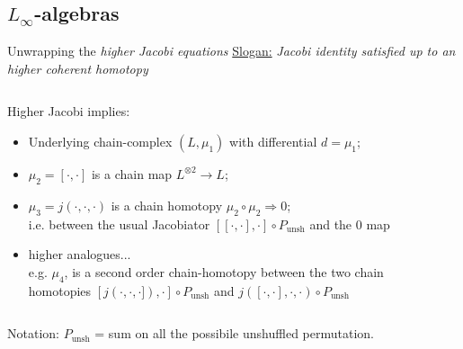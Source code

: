 \documentclass[beamer,10pt]{standalone}
\begin{document}
\subsection{$L_\infty$-algebras}

\begin{frame}{Unwrapping the \emph{higher Jacobi equations}}\label{Frame:unwapping-Jacobi}
\underline{Slogan:} \emph{Jacobi identity satisfied up to an higher coherent homotopy}
		\vspace{1.5em}
		\begin{columns}[c]
			\hfill
			\begin{column}{0.5\linewidth}
				Higher Jacobi implies:
				\begin{itemize}  \setlength\itemsep{1em}
					\item Underlying chain-complex $(L,\mu_1)$ with differential $d=\mu_1$;
					\item \color{red} $\mu_2 = [\cdot,\cdot]$ is a chain map $L^{\otimes 2} \to L$;
					\item \color{green!20!black}$\mu_3=j(\cdot,\cdot,\cdot)$ is a chain homotopy 
						$\mu_2\circ\mu_2 \Rightarrow 0$;
						\\ i.e. between the usual Jacobiator ${[[\cdot,\cdot],\cdot]} \circ P_{\text{unsh}}$ and the $0$ map 
					\item \color{purple}higher analogues...	
					\\ e.g. $\mu_4$, is a second order chain-homotopy between the two chain homotopies  ${[j(\cdot,\cdot ,\cdot]),\cdot]}\circ P_{\text{unsh}}$ and ${j([\cdot , \cdot],\cdot,\cdot)}\circ P_{\text{unsh}}$
				\end{itemize}
			\end{column}
			\begin{column}{0.45\linewidth}
				
			\end{column}	
		\end{columns}	
		\vspace{1.5em}
		Notation: $P_{\text{unsh}}$ = sum on all the possibile unshuffled permutation.

\end{frame}
\end{document}
